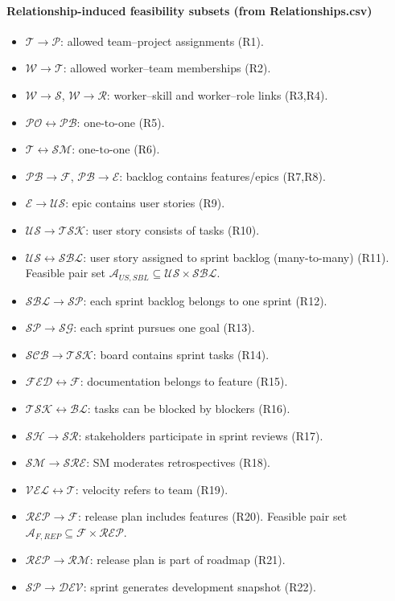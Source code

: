 \documentclass[11pt,a4paper]{article}
\begin{document}
\paragraph{Relationship-induced feasibility subsets (from Relationships.csv)}
\begin{itemize}
  \item $\mathcal{T}\!\to\!\mathcal{P}$: allowed team--project assignments (R1).
  \item $\mathcal{W}\!\to\!\mathcal{T}$: allowed worker--team memberships (R2).
  \item $\mathcal{W}\!\to\!\mathcal{S}$, $\mathcal{W}\!\to\!\mathcal{R}$: worker--skill and worker--role links (R3,R4).
  \item $\mathcal{PO}\!\leftrightarrow\!\mathcal{PB}$: $\text{one-to-one}$ (R5).
  \item $\mathcal{T}\!\leftrightarrow\!\mathcal{SM}$: $\text{one-to-one}$ (R6).
  \item $\mathcal{PB}\!\to\!\mathcal{F}$, $\mathcal{PB}\!\to\!\mathcal{E}$: backlog contains features/epics (R7,R8).
  \item $\mathcal{E}\!\to\!\mathcal{US}$: epic contains user stories (R9).
  \item $\mathcal{US}\!\to\!\mathcal{TSK}$: user story consists of tasks (R10).
  \item $\mathcal{US}\!\leftrightarrow\!\mathcal{SBL}$: user story assigned to sprint backlog (many-to-many) (R11). Feasible pair set $\mathcal{A}_{US,SBL}\subseteq \mathcal{US}\times\mathcal{SBL}$.
  \item $\mathcal{SBL}\!\to\!\mathcal{SP}$: each sprint backlog belongs to one sprint (R12).
  \item $\mathcal{SP}\!\to\!\mathcal{SG}$: each sprint pursues one goal (R13).
  \item $\mathcal{SCB}\!\to\!\mathcal{TSK}$: board contains sprint tasks (R14).
  \item $\mathcal{FED}\!\leftrightarrow\!\mathcal{F}$: documentation belongs to feature (R15).
  \item $\mathcal{TSK}\!\leftrightarrow\!\mathcal{BL}$: tasks can be blocked by blockers (R16).
  \item $\mathcal{SH}\!\to\!\mathcal{SR}$: stakeholders participate in sprint reviews (R17).
  \item $\mathcal{SM}\!\to\!\mathcal{SRE}$: SM moderates retrospectives (R18).
  \item $\mathcal{VEL}\!\leftrightarrow\!\mathcal{T}$: velocity refers to team (R19).
  \item $\mathcal{REP}\!\to\!\mathcal{F}$: release plan includes features (R20). Feasible pair set $\mathcal{A}_{F,REP}\subseteq \mathcal{F}\times\mathcal{REP}$.
  \item $\mathcal{REP}\!\to\!\mathcal{RM}$: release plan is part of roadmap (R21).
  \item $\mathcal{SP}\!\to\!\mathcal{DEV}$: sprint generates development snapshot (R22).
\end{itemize}
\end{document}

